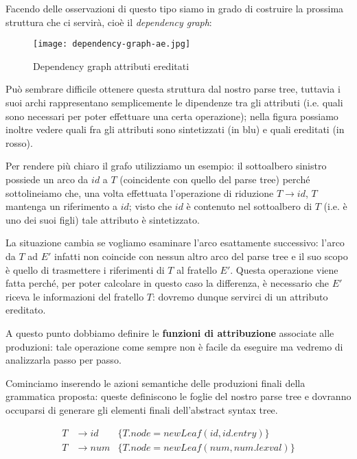 \documentclass[class=book, crop=false, oneside, 12pt]{standalone}
\begin{document}
Facendo delle osservazioni di questo tipo siamo in grado di costruire la prossima struttura che ci servirà, cioè il \emph{dependency graph}: 

\begin{figure}[H]
	\centering
    \texttt{[image: dependency-graph-ae.jpg]}
    \caption{Dependency graph attributi ereditati}
    \label{fig:dependency-graph-ae}
\end{figure}

Può sembrare difficile ottenere questa struttura dal nostro parse tree, tuttavia i suoi archi rappresentano semplicemente le dipendenze tra gli attributi (i.e. quali sono necessari per poter effettuare una certa operazione); nella figura possiamo inoltre vedere quali fra gli attributi sono sintetizzati (in blu) e quali ereditati (in rosso). 

Per rendere più chiaro il grafo utilizziamo un esempio: il sottoalbero sinistro possiede un arco da \(id\) a \(T\) (coincidente con quello del parse tree) perché sottolineiamo che, una volta effettuata l'operazione di riduzione \(T \to id\), \(T\) mantenga un riferimento a \(id\); visto che \(id\) è contenuto nel sottoalbero di \(T\) (i.e. è uno dei suoi figli) tale attributo è sintetizzato. 

La situazione cambia se vogliamo esaminare l'arco esattamente successivo: l'arco da \(T\) ad \(E'\) infatti non coincide con nessun altro arco del parse tree e il suo scopo è quello di trasmettere i riferimenti di \(T\) al fratello \(E'\). Questa operazione viene fatta perché, per poter calcolare in questo caso la differenza, è necessario che \(E'\) riceva le informazioni del fratello \(T\): dovremo dunque servirci di un attributo ereditato.

A questo punto dobbiamo definire le \textbf{funzioni di attribuzione} associate alle produzioni: tale operazione come sempre non è facile da eseguire ma vedremo di analizzarla passo per passo. 

Cominciamo inserendo le azioni semantiche delle produzioni finali della grammatica proposta: queste definiscono le foglie del nostro parse tree e dovranno occuparsi di generare gli elementi finali dell'abstract syntax tree.

\begin{align*}
    T &\to id &\{T.node = newLeaf(id, id.entry)\} \\
    T &\to num &\{T.node = newLeaf(num, num.lexval)\}
\end{align*}
\end{document}
